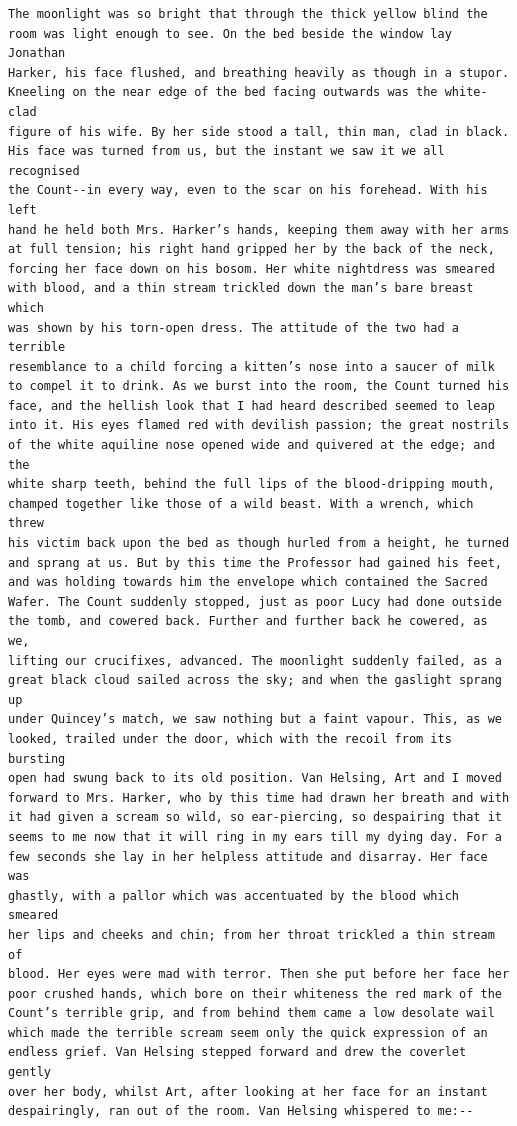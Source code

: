 \documentclass{article}
\begin{document}
\begin{verbatim}
The moonlight was so bright that through the thick yellow blind the
room was light enough to see. On the bed beside the window lay Jonathan
Harker, his face flushed, and breathing heavily as though in a stupor.
Kneeling on the near edge of the bed facing outwards was the white-clad
figure of his wife. By her side stood a tall, thin man, clad in black.
His face was turned from us, but the instant we saw it we all recognised
the Count--in every way, even to the scar on his forehead. With his left
hand he held both Mrs. Harker’s hands, keeping them away with her arms
at full tension; his right hand gripped her by the back of the neck,
forcing her face down on his bosom. Her white nightdress was smeared
with blood, and a thin stream trickled down the man’s bare breast which
was shown by his torn-open dress. The attitude of the two had a terrible
resemblance to a child forcing a kitten’s nose into a saucer of milk
to compel it to drink. As we burst into the room, the Count turned his
face, and the hellish look that I had heard described seemed to leap
into it. His eyes flamed red with devilish passion; the great nostrils
of the white aquiline nose opened wide and quivered at the edge; and the
white sharp teeth, behind the full lips of the blood-dripping mouth,
champed together like those of a wild beast. With a wrench, which threw
his victim back upon the bed as though hurled from a height, he turned
and sprang at us. But by this time the Professor had gained his feet,
and was holding towards him the envelope which contained the Sacred
Wafer. The Count suddenly stopped, just as poor Lucy had done outside
the tomb, and cowered back. Further and further back he cowered, as we,
lifting our crucifixes, advanced. The moonlight suddenly failed, as a
great black cloud sailed across the sky; and when the gaslight sprang up
under Quincey’s match, we saw nothing but a faint vapour. This, as we
looked, trailed under the door, which with the recoil from its bursting
open had swung back to its old position. Van Helsing, Art and I moved
forward to Mrs. Harker, who by this time had drawn her breath and with
it had given a scream so wild, so ear-piercing, so despairing that it
seems to me now that it will ring in my ears till my dying day. For a
few seconds she lay in her helpless attitude and disarray. Her face was
ghastly, with a pallor which was accentuated by the blood which smeared
her lips and cheeks and chin; from her throat trickled a thin stream of
blood. Her eyes were mad with terror. Then she put before her face her
poor crushed hands, which bore on their whiteness the red mark of the
Count’s terrible grip, and from behind them came a low desolate wail
which made the terrible scream seem only the quick expression of an
endless grief. Van Helsing stepped forward and drew the coverlet gently
over her body, whilst Art, after looking at her face for an instant
despairingly, ran out of the room. Van Helsing whispered to me:--


\end{verbatim}
\end{document}
